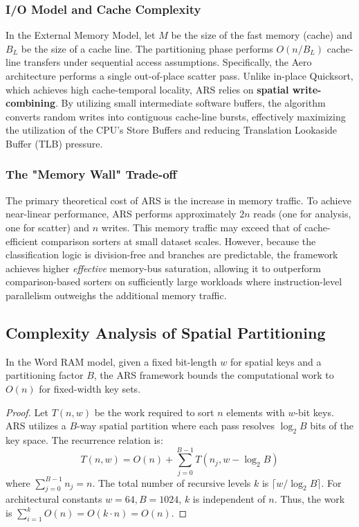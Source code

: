 \subsubsection{I/O Model and Cache Complexity}
In the External Memory Model, let $M$ be the size of the fast memory (cache) and $B_L$ be the size of a cache line.
The partitioning phase performs $O(n/B_L)$ cache-line transfers under sequential access assumptions.
Specifically, the Aero architecture performs a single out-of-place scatter pass.
Unlike in-place Quicksort, which achieves high cache-temporal locality, ARS relies on \textbf{spatial write-combining}.
By utilizing small intermediate software buffers, the algorithm converts random writes into contiguous cache-line bursts, effectively maximizing the utilization of the CPU's Store Buffers and reducing Translation Lookaside Buffer (TLB) pressure.

\subsubsection{The "Memory Wall" Trade-off}
The primary theoretical cost of ARS is the increase in memory traffic.
To achieve near-linear performance, ARS performs approximately $2n$ reads (one for analysis, one for scatter) and $n$ writes.
This memory traffic may exceed that of cache-efficient comparison sorters at small dataset scales.
However, because the classification logic is division-free and branches are predictable, the framework achieves higher \textit{effective} memory-bus saturation, allowing it to outperform comparison-based sorters on sufficiently large workloads where instruction-level parallelism outweighs the additional memory traffic.

\subsection{Complexity Analysis of Spatial Partitioning}
\begin{theorem}
In the Word RAM model, given a fixed bit-length $w$ for spatial keys and a partitioning factor $B$, the ARS framework bounds the computational work to $O(n)$ for fixed-width key sets.
\end{theorem}

\begin{proof}
Let $T(n, w)$ be the work required to sort $n$ elements with $w$-bit keys.
ARS utilizes a $B$-way spatial partition where each pass resolves $\log_2 B$ bits of the key space.
The recurrence relation is:
\begin{equation}
T(n, w) = O(n) + \sum_{j=0}^{B-1} T(n_j, w - \log_2 B)
\end{equation}
where $\sum_{j=0}^{B-1} n_j = n$.
The total number of recursive levels $k$ is $\lceil w / \log_2 B \rceil$.
For architectural constants $w=64, B=1024$, $k$ is independent of $n$.
Thus, the work is $\sum_{i=1}^{k} O(n) = O(k \cdot n) = O(n)$. 
\end{proof}

